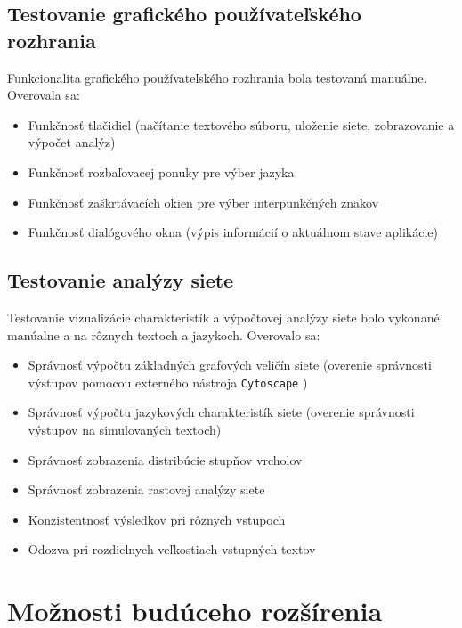 \subsection{Testovanie grafického používateľského rozhrania}\label{sec:testingGUI}

Funkcionalita grafického používateľského rozhrania bola testovaná manuálne. Overovala sa:
\begin{itemize}
    \item Funkčnosť tlačidiel (načítanie textového súboru, uloženie siete, zobrazovanie a výpočet analýz)
    \item Funkčnosť rozbaľovacej ponuky pre výber jazyka
    \item Funkčnosť zaškrtávacích okien pre výber interpunkčných znakov
    \item Funkčnosť dialógového okna (výpis informácií o aktuálnom stave aplikácie)
\end{itemize}

\subsection{Testovanie analýzy siete}\label{sec:testingNetworkAnalysis}

Testovanie vizualizácie charakteristík a výpočtovej analýzy siete bolo vykonané manúalne a na rôznych textoch a jazykoch. Overovalo sa:
\begin{itemize}
    \item Správnosť výpočtu základných grafových veličín siete (overenie správnosti výstupov pomocou externého nástroja \texttt{Cytoscape} \cite{cytoscape_website} )
    \item Správnosť výpočtu jazykových charakteristík siete (overenie správnosti výstupov na simulovaných textoch)
    \item Správnosť zobrazenia distribúcie stupňov vrcholov
    \item Správnosť zobrazenia rastovej analýzy siete
    \item Konzistentnosť výsledkov pri rôznych vstupoch
    \item Odozva pri rozdielnych veľkostiach vstupných textov
\end{itemize}


\section{Možnosti budúceho rozšírenia}\label{sec:futureExtensions}


